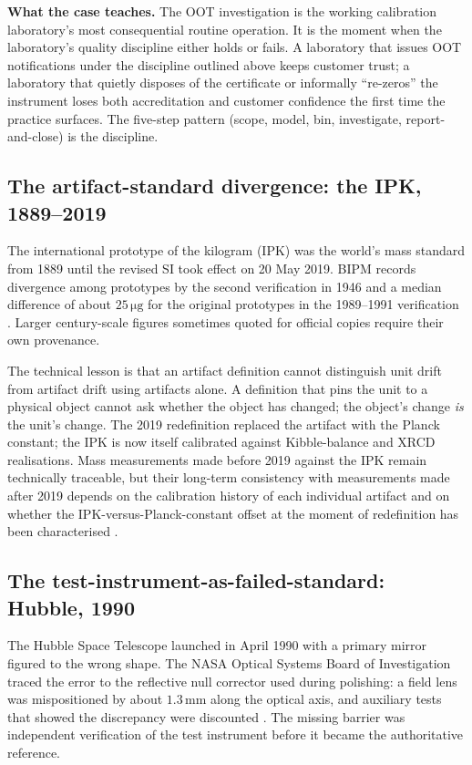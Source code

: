 \textbf{What the case teaches.} The OOT investigation is the
working calibration laboratory's most consequential routine
operation. It is the moment when the laboratory's quality
discipline either holds or fails. A laboratory that issues OOT
notifications under the discipline outlined above keeps customer
trust; a laboratory that quietly disposes of the certificate or
informally ``re-zeros'' the instrument loses both accreditation
and customer confidence the first time the practice surfaces.
The five-step pattern (scope, model, bin, investigate,
report-and-close) is the discipline.

\subsection{The artifact-standard divergence: the IPK, 1889--2019}

The international prototype of the kilogram (IPK) was the world's
mass standard from 1889 until the revised SI took effect on 20 May
2019. BIPM records divergence among prototypes by the second
verification in 1946 and a median difference of about
$25 \,\si{\micro\gram}$ for the original prototypes in the
1989--1991 verification \cite{web:bipm-kilogram-history,
std:bipm-si2019}. Larger century-scale figures sometimes quoted for
official copies require their own provenance.

The technical lesson is that an artifact definition cannot
distinguish unit drift from artifact drift using artifacts alone. A
definition that pins the unit to a physical object cannot ask
whether the object has changed; the object's change \emph{is} the
unit's change. The 2019 redefinition replaced the artifact with the
Planck constant; the IPK is now itself calibrated against
Kibble-balance and XRCD realisations. Mass measurements made before
2019 against the IPK remain technically traceable, but their
long-term consistency with measurements made after 2019 depends on
the calibration history of each individual artifact and on whether
the IPK-versus-Planck-constant offset at the moment of redefinition
has been characterised \cite{web:nist-kibble-balance}.

\subsection{The test-instrument-as-failed-standard: Hubble, 1990}

The Hubble Space Telescope launched in April 1990 with a primary
mirror figured to the wrong shape. The NASA Optical Systems Board of
Investigation traced the error to the reflective null corrector
used during polishing: a field lens was mispositioned by about
$1.3 \,\si{\milli\meter}$ along the optical axis, and auxiliary
tests that showed the discrepancy were discounted
\cite{acc:nasa-hubble-optical-systems-1990}. The missing barrier
was independent verification of the test instrument before it
became the authoritative reference.

